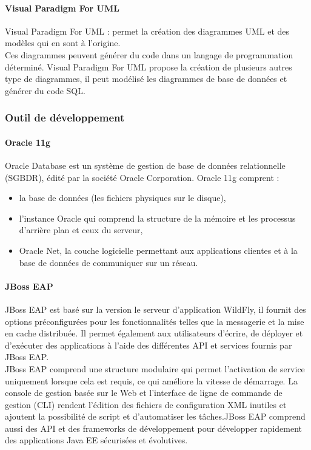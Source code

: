 \paragraph{Visual Paradigm For UML \\}
Visual Paradigm For UML : permet la création des diagrammes UML et des modèles qui en sont à l'origine.\\
Ces diagrammes peuvent générer du code dans un langage de programmation déterminé. Visual Paradigm
For UML propose la création de plusieurs autres type de diagrammes, il peut modélisé les diagrammes de base
de données et générer du code SQL.

\subsubsection{Outil de développement}
\paragraph{Oracle 11g \\}
Oracle Database est un système de gestion de base de données relationnelle (SGBDR), édité par la société Oracle Corporation.
Oracle 11g comprent : 
\begin{itemize}
    \item la base de données (les fichiers physiques sur le disque),
    \item l'instance Oracle qui comprend la structure de la mémoire et les processus d'arrière plan et ceux du serveur,
    \item Oracle Net, la couche logicielle permettant aux applications clientes et à la base de données de communiquer sur un réseau.
\end{itemize}

\paragraph{JBoss EAP \\}
JBoss EAP est basé sur la version le serveur d'application WildFly,
il fournit des options préconfigurées pour les fonctionnalités telles que la messagerie et la mise en cache distribuée. Il permet également aux utilisateurs d'écrire, de déployer et d'exécuter des applications à l'aide des différentes API et services fournis par JBoss EAP.\\
JBoss EAP comprend une structure modulaire qui permet l'activation de service uniquement lorsque cela est requis, ce qui améliore la vitesse de démarrage. La console de gestion basée sur le Web et l'interface de ligne de commande de gestion (CLI) rendent l'édition des fichiers de configuration XML inutiles et ajoutent la possibilité de script et d'automatiser les tâches.JBoss EAP comprend aussi des API et des frameworks de développement pour développer rapidement des applications Java EE sécurisées et évolutives.

